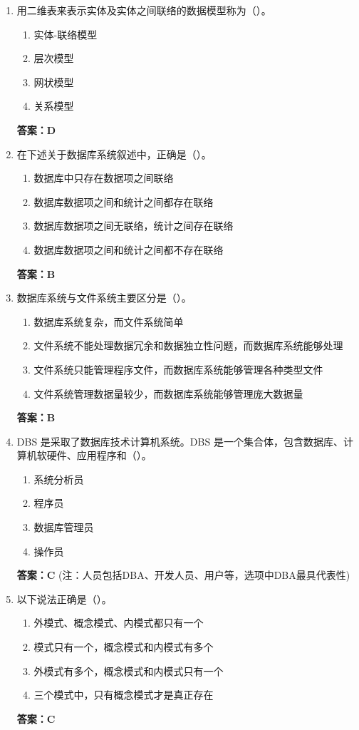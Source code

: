 \documentclass[12pt, a4paper]{article}
\begin{document}
\begin{enumerate}[label=\arabic*.]
    \item 用二维表来表示实体及实体之间联络的数据模型称为（\quad）。
    \begin{enumerate}
        \item 实体-联络模型
        \item 层次模型
        \item 网状模型
        \item 关系模型
    \end{enumerate}
    \textbf{答案：D}

    \item 在下述关于数据库系统叙述中，正确是（\quad）。
    \begin{enumerate}
        \item 数据库中只存在数据项之间联络
        \item 数据库数据项之间和统计之间都存在联络
        \item 数据库数据项之间无联络，统计之间存在联络
        \item 数据库数据项之间和统计之间都不存在联络
    \end{enumerate}
    \textbf{答案：B}

    \item 数据库系统与文件系统主要区分是（\quad）。
    \begin{enumerate}
        \item 数据库系统复杂，而文件系统简单
        \item 文件系统不能处理数据冗余和数据独立性问题，而数据库系统能够处理
        \item 文件系统只能管理程序文件，而数据库系统能够管理各种类型文件
        \item 文件系统管理数据量较少，而数据库系统能够管理庞大数据量
    \end{enumerate}
    \textbf{答案：B}

    \item DBS 是采取了数据库技术计算机系统。DBS 是一个集合体，包含数据库、计算机软硬件、应用程序和（\quad）。
    \begin{enumerate}
        \item 系统分析员
        \item 程序员
        \item 数据库管理员
        \item 操作员
    \end{enumerate}
    \textbf{答案：C} (注：人员包括DBA、开发人员、用户等，选项中DBA最具代表性)

    \item 以下说法正确是（\quad）。
    \begin{enumerate}
        \item 外模式、概念模式、内模式都只有一个
        \item 模式只有一个，概念模式和内模式有多个
        \item 外模式有多个，概念模式和内模式只有一个
        \item 三个模式中，只有概念模式才是真正存在
    \end{enumerate}
    \textbf{答案：C}


\end{enumerate}
\end{document}
